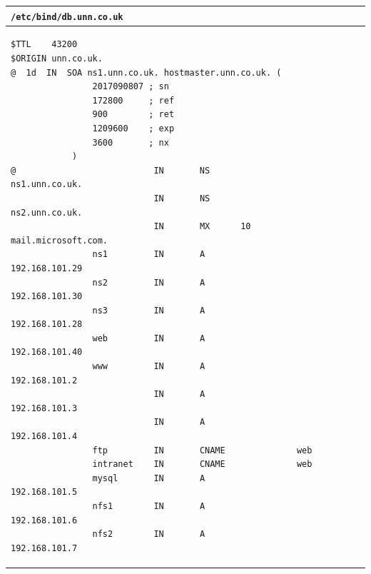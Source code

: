 \documentclass[11pt]{article}
\begin{document}
\begin{table}[ht]
    \begin{tabular}{|p{17.5cm}|} 
        \hline
        \texttt{\textbf{/etc/bind/db.unn.co.uk}}\\ 
        \hline
        \lstset{
                basicstyle=\scriptsize\ttfamily,
              }
              \begin{lstlisting}
$TTL    43200 
$ORIGIN unn.co.uk.
@  1d  IN  SOA ns1.unn.co.uk. hostmaster.unn.co.uk. (
                2017090807 ; sn
                172800     ; ref
                900        ; ret
                1209600    ; exp
                3600       ; nx
            )
@                           IN       NS                 ns1.unn.co.uk.
                            IN       NS                 ns2.unn.co.uk.
                            IN       MX      10         mail.microsoft.com.
                ns1         IN       A                  192.168.101.29
                ns2         IN       A                  192.168.101.30
                ns3         IN       A                  192.168.101.28
                web         IN       A                  192.168.101.40
                www         IN       A                  192.168.101.2
                            IN       A                  192.168.101.3
                            IN       A                  192.168.101.4
                ftp         IN       CNAME              web
                intranet    IN       CNAME              web
                mysql       IN       A                  192.168.101.5
                nfs1        IN       A                  192.168.101.6
                nfs2        IN       A                  192.168.101.7
        \end{lstlisting}\\
        \hline
    \end{tabular}
\end{table} 
\end{document}
